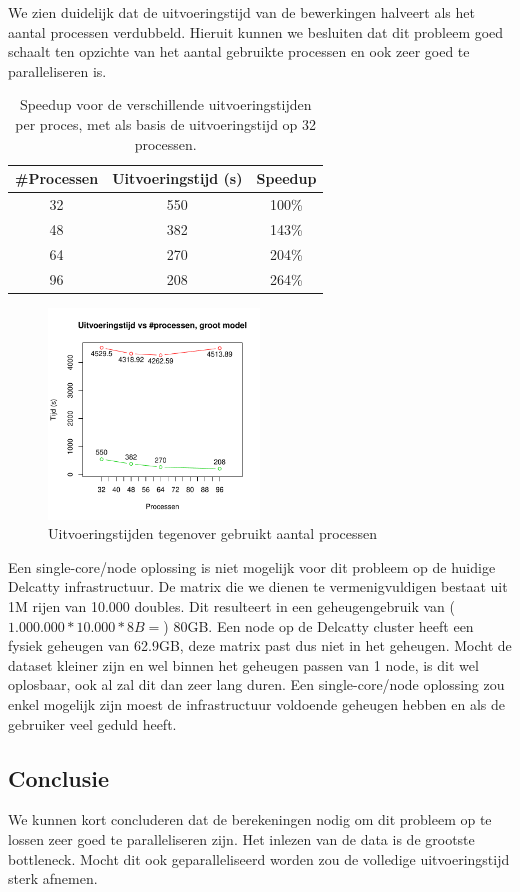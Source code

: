 \documentclass[a4paper,12pt]{report}
\begin{document}
We zien duidelijk dat de uitvoeringstijd van de bewerkingen halveert als het aantal processen verdubbeld. Hieruit kunnen we besluiten dat dit probleem goed schaalt ten opzichte van het aantal gebruikte processen en ook zeer goed te paralleliseren is.

\begin{table}
\centering
	\caption{Speedup voor de verschillende uitvoeringstijden per proces, met als basis de uitvoeringstijd op 32 processen.}
	\begin{tabular}{c|c|c}
	\#Processen & Uitvoeringstijd (s) & Speedup \\ 
	\hline \hline 32 & 550 & 100\% \\ 
	\hline 48 & 382 & 143\% \\ 
	\hline 64 & 270 & 204\% \\ 
	\hline 96 & 208 & 264\% \\  
	\end{tabular}
	\label{speeduptabel}
\end{table}

\begin{figure}
    \centering
    \includegraphics[width=0.5\textwidth]{includes/speed}
    \caption{Uitvoeringstijden tegenover gebruikt aantal processen}
    \label{speed}
\end{figure}

Een single-core/node oplossing is niet mogelijk voor dit probleem op de huidige Delcatty infrastructuur. De matrix die we dienen te vermenigvuldigen bestaat uit 1M rijen van 10.000 doubles. Dit resulteert in een geheugengebruik van ($1.000.000*10.000*8B=$) 80GB. Een node op de Delcatty cluster heeft een fysiek geheugen van 62.9GB, deze matrix past dus niet in het geheugen. Mocht de dataset kleiner zijn en wel binnen het geheugen passen van 1 node, is dit wel oplosbaar, ook al zal dit dan zeer lang duren.
Een single-core/node oplossing zou enkel mogelijk zijn moest de infrastructuur voldoende geheugen hebben en als de gebruiker veel geduld heeft.

\subsection{Conclusie}
We kunnen kort concluderen dat de berekeningen nodig om dit probleem op te lossen zeer goed te paralleliseren zijn. Het inlezen van de data is de grootste bottleneck. Mocht dit ook geparalleliseerd worden zou de volledige uitvoeringstijd sterk afnemen.
\end{document}
